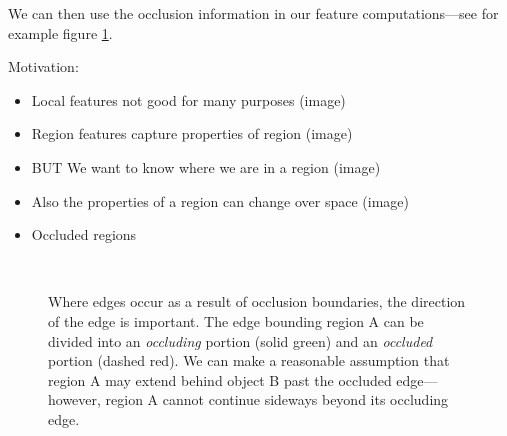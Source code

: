 \documentclass[10pt,twocolumn,letterpaper]{article}
\newcommand{\point}{\mathbf{p}}
\begin{document}
We can then use the occlusion information in our feature computations---see for example figure \ref{fig:occluded_region}.

Motivation:
\begin{itemize}
\item Local features not good for many purposes (image)
\item Region features capture properties of region (image)
\item BUT We want to know where we are in a region  (image)
\item Also the properties of a region can change over space (image)
\item Occluded regions
\end{itemize}




\begin{figure}
    \centering 
        \hfill
     \\
    \caption{Where edges occur as a result of occlusion boundaries, the direction of the edge is important. The edge bounding region A can be divided into an \emph{occluding} portion (solid green) and an \emph{occluded} portion (dashed red).
    We can make a reasonable assumption that region A may extend behind object B past the occluded edge---however, region A cannot continue sideways beyond its occluding edge.}
    \label{fig:occluded_region}
\end{figure}

\end{document}
